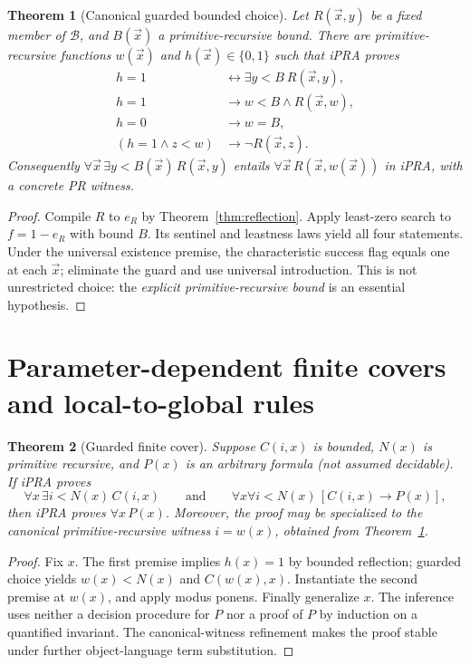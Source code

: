 \documentclass[11pt]{article}
\newtheorem{theorem}{Theorem}[section]
\newcommand{\bfam}{\mathcal B}
\begin{document}
\begin{theorem}[Canonical guarded bounded choice]\label{thm:choice}
Let $R(\vec x,y)$ be a fixed member of $\bfam$, and $B(\vec x)$ a primitive-recursive bound. There are primitive-recursive functions $w(\vec x)$ and $h(\vec x)\in\{0,1\}$ such that iPRA proves
\begin{align*}
h=1&\leftrightarrow\exists y<B\ R(\vec x,y),\\
h=1&\to w<B\land R(\vec x,w),\\
h=0&\to w=B,\\
(h=1\land z<w)&\to\neg R(\vec x,z).
\end{align*}
Consequently $\forall \vec x\,\exists y<B(\vec x)\,R(\vec x,y)$ entails $\forall \vec x\,R(\vec x,w(\vec x))$ in iPRA, with a concrete PR witness.
\end{theorem}
\begin{proof}
Compile $R$ to $e_R$ by Theorem~\ref{thm:reflection}. Apply least-zero search to $f=1-e_R$ with bound $B$. Its sentinel and leastness laws yield all four statements. Under the universal existence premise, the characteristic success flag equals one at each $\vec x$; eliminate the guard and use universal introduction. This is not unrestricted choice: the \emph{explicit primitive-recursive bound} is an essential hypothesis.
\end{proof}

\section{Parameter-dependent finite covers and local-to-global rules}
\begin{theorem}[Guarded finite cover]\label{thm:cover}
Suppose $C(i,x)$ is bounded, $N(x)$ is primitive recursive, and $P(x)$ is an arbitrary formula (not assumed decidable). If iPRA proves
\[\forall x\,\exists i<N(x)\,C(i,x)\qquad\text{and}\qquad\forall x\forall i<N(x)\,[C(i,x)\to P(x)],\]
then iPRA proves $\forall x\,P(x)$. Moreover, the proof may be specialized to the canonical primitive-recursive witness $i=w(x)$, obtained from Theorem~\ref{thm:choice}.
\end{theorem}
\begin{proof}
Fix $x$. The first premise implies $h(x)=1$ by bounded reflection; guarded choice yields $w(x)<N(x)$ and $C(w(x),x)$. Instantiate the second premise at $w(x)$, and apply modus ponens. Finally generalize $x$. The inference uses neither a decision procedure for $P$ nor a proof of $P$ by induction on a quantified invariant. The canonical-witness refinement makes the proof stable under further object-language term substitution.
\end{proof}
\end{document}
